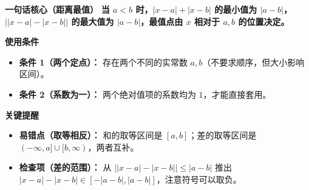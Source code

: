 \begin{summarybox}
	\textbf{\textcolor{CSummary}{一句话核心（距离最值）}}
	\textbf{当 $a<b$ 时，$|x-a|+|x-b|$ 的最小值为 $|a-b|$，$\bigl| |x-a|-|x-b| \bigr|$ 的最大值为 $|a-b|$，最值点由 $x$ 相对于 $a,b$ 的位置决定。}

	\medskip
	\textbf{\textcolor{CSummary}{使用条件}}
	\begin{itemize}[leftmargin=*, itemsep=0.5em, topsep=0.4em]
		\item \textbf{条件 1（两个定点）：} 存在两个不同的实常数 $a,b$（不要求顺序，但大小影响区间）。
		\item \textbf{条件 2（系数为一）：} 两个绝对值项的系数均为 $1$，才能直接套用。
	\end{itemize}

	\medskip
	\textbf{\textcolor{CSummary}{关键提醒}}
	\begin{itemize}[leftmargin=*, itemsep=0.5em, topsep=0.4em]
		\item \textbf{易错点（取等相反）：} 和的取等区间是 $[a,b]$；差的取等区间是 $(-\infty,a]\cup[b,\infty)$，两者互补。
		\item \textbf{检查项（差的范围）：} 从 $\bigl| |x-a|-|x-b| \bigr| \le |a-b|$ 推出 $|x-a|-|x-b| \in [-|a-b|, |a-b|]$，注意符号可以取负。
	\end{itemize}

\end{summarybox}
